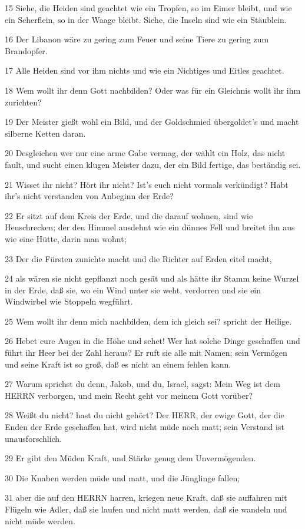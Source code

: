 \par 15 Siehe, die Heiden sind geachtet wie ein Tropfen, so im Eimer bleibt, und wie ein Scherflein, so in der Waage bleibt. Siehe, die Inseln sind wie ein Stäublein.
\par 16 Der Libanon wäre zu gering zum Feuer und seine Tiere zu gering zum Brandopfer.
\par 17 Alle Heiden sind vor ihm nichts und wie ein Nichtiges und Eitles geachtet.
\par 18 Wem wollt ihr denn Gott nachbilden? Oder was für ein Gleichnis wollt ihr ihm zurichten?
\par 19 Der Meister gießt wohl ein Bild, und der Goldschmied übergoldet's und macht silberne Ketten daran.
\par 20 Desgleichen wer nur eine arme Gabe vermag, der wählt ein Holz, das nicht fault, und sucht einen klugen Meister dazu, der ein Bild fertige, das beständig sei.
\par 21 Wisset ihr nicht? Hört ihr nicht? Ist's euch nicht vormals verkündigt? Habt ihr's nicht verstanden von Anbeginn der Erde?
\par 22 Er sitzt auf dem Kreis der Erde, und die darauf wohnen, sind wie Heuschrecken; der den Himmel ausdehnt wie ein dünnes Fell und breitet ihn aus wie eine Hütte, darin man wohnt;
\par 23 Der die Fürsten zunichte macht und die Richter auf Erden eitel macht,
\par 24 als wären sie nicht gepflanzt noch gesät und als hätte ihr Stamm keine Wurzel in der Erde, daß sie, wo ein Wind unter sie weht, verdorren und sie ein Windwirbel wie Stoppeln wegführt.
\par 25 Wem wollt ihr denn mich nachbilden, dem ich gleich sei? spricht der Heilige.
\par 26 Hebet eure Augen in die Höhe und sehet! Wer hat solche Dinge geschaffen und führt ihr Heer bei der Zahl heraus? Er ruft sie alle mit Namen; sein Vermögen und seine Kraft ist so groß, daß es nicht an einem fehlen kann.
\par 27 Warum sprichst du denn, Jakob, und du, Israel, sagst: Mein Weg ist dem HERRN verborgen, und mein Recht geht vor meinem Gott vorüber?
\par 28 Weißt du nicht? hast du nicht gehört? Der HERR, der ewige Gott, der die Enden der Erde geschaffen hat, wird nicht müde noch matt; sein Verstand ist unausforschlich.
\par 29 Er gibt den Müden Kraft, und Stärke genug dem Unvermögenden.
\par 30 Die Knaben werden müde und matt, und die Jünglinge fallen;
\par 31 aber die auf den HERRN harren, kriegen neue Kraft, daß sie auffahren mit Flügeln wie Adler, daß sie laufen und nicht matt werden, daß sie wandeln und nicht müde werden.

